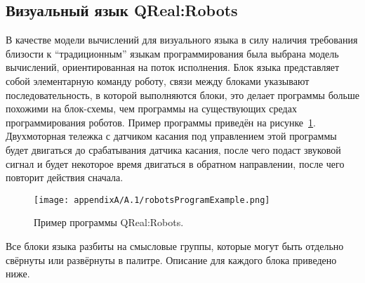 \subsection{Визуальный язык QReal:Robots}
В качестве модели вычислений для визуального языка в силу наличия требования близости 
к "`традиционным"' языкам программирования была выбрана модель вычислений, ориентированная 
на поток исполнения. Блок языка представляет собой элементарную команду роботу, связи 
между блоками указывают последовательность, в которой выполняются блоки, это делает 
программы больше похожими на блок-схемы, чем программы на существующих средах программирования 
роботов. Пример программы приведён на рисунке~\ref{image:robotsProgramExample}. Двухмоторная 
тележка с датчиком касания под управлением этой программы будет двигаться до срабатывания 
датчика касания, после чего подаст звуковой сигнал и будет некоторое время двигаться 
в обратном направлении, после чего повторит действия сначала.

\begin{figure} [ht]
	\begin{center}
		\texttt{[image: appendixA/A.1/robotsProgramExample.png]}
		\caption{Пример программы QReal:Robots.}
		\label{image:robotsProgramExample}
	\end{center}
\end{figure}

Все блоки языка разбиты на смысловые группы, которые могут быть отдельно свёрнуты 
или развёрнуты в палитре. Описание для каждого блока приведено ниже.


